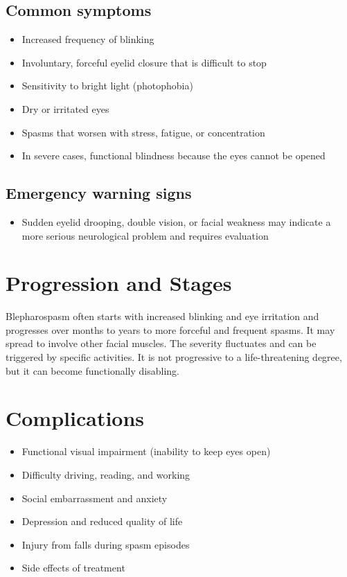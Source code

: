 \subsection{Common symptoms}
\begin{itemize}[noitemsep]
  \item Increased frequency of blinking
  \item Involuntary, forceful eyelid closure that is difficult to stop
  \item Sensitivity to bright light (photophobia)
  \item Dry or irritated eyes
  \item Spasms that worsen with stress, fatigue, or concentration
  \item In severe cases, functional blindness because the eyes cannot be opened
\end{itemize}
\subsection{Emergency warning signs}
\begin{itemize}[noitemsep]
  \item Sudden eyelid drooping, double vision, or facial weakness may indicate a more serious neurological problem and requires evaluation
\end{itemize}
\section{Progression and Stages}
Blepharospasm often starts with increased blinking and eye irritation and progresses over months to years to more forceful and frequent spasms. It may spread to involve other facial muscles. The severity fluctuates and can be triggered by specific activities. It is not progressive to a life-threatening degree, but it can become functionally disabling.
\section{Complications}
\begin{itemize}[noitemsep]
  \item Functional visual impairment (inability to keep eyes open)
  \item Difficulty driving, reading, and working
  \item Social embarrassment and anxiety
  \item Depression and reduced quality of life
  \item Injury from falls during spasm episodes
  \item Side effects of treatment
\end{itemize}
